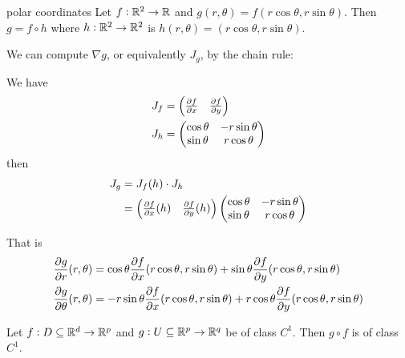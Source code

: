 \documentclass[12pt]{extarticle}
\begin{document}
\begin{example}{polar coordinates}
    Let $f: \mathbb{R}^2 \to \mathbb{R}$ and $g(r, \theta) = f(r \cos \theta, r \sin \theta)$.
    Then $g = f \circ h$ where $h: \mathbb{R}^2 \to \mathbb{R}^2$ is $h(r, \theta) = (r \cos \theta, r \sin \theta)$.

    We can compute $\nabla g$, or equivalently $J_g$, by the chain rule:

    We have
    \begin{align}
        J_f & = \begin{pmatrix}
                    \pdv{f}{x}\/ & \pdv{f}{y}\/
                \end{pmatrix}  \\
        J_h & = \begin{pmatrix}
                    \cos \theta & -r \sin \theta \\
                    \sin \theta & r \cos \theta
                \end{pmatrix}
    \end{align}
    then
    \begin{align}
        J_g & = J_f(h) \cdot J_h                  \\
            & = \begin{pmatrix}
                    \pdv{f}{x}\/(h) & \pdv{f}{y}\/(h)
                \end{pmatrix}
        \begin{pmatrix}
            \cos \theta & -r \sin \theta \\
            \sin \theta & r \cos \theta
        \end{pmatrix}
    \end{align}

    That is
    \begin{align}
        \pdv{g}{r}\/(r, \theta)      & = \cos \theta \pdv{f}{x}\/(r \cos \theta, r \sin \theta) + \sin \theta \pdv{f}{y}\/(r \cos \theta, r \sin \theta)      \\
        \pdv{g}{\theta}\/(r, \theta) & = -r \sin \theta \pdv{f}{x}\/(r \cos \theta, r \sin \theta) + r \cos \theta \pdv{f}{y}\/(r \cos \theta, r \sin \theta)
    \end{align}

\end{example}

\begin{proposition}
    Let $f: D \subseteq \mathbb{R}^d \to \mathbb{R}^p$ and $g: U \subseteq \mathbb{R}^p \to \mathbb{R}^q$ be of class $C^1$.
    Then $g \circ f$ is of class $C^1$.
\end{proposition}
\end{document}
